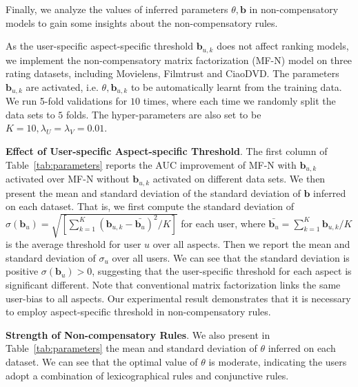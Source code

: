 \documentclass[letterpaper]{article} %
\begin{document}
Finally, we analyze the values of inferred parameters $\theta,\mathbf{b}$ in non-compensatory models to gain some insights about the non-compensatory rules. 

As the user-specific aspect-specific threshold $\mathbf{b}_{u,k}$ does not affect ranking models, we implement the non-compensatory matrix factorization (MF-N) model on three rating datasets, including Movielens, Filmtrust and CiaoDVD. The parameters $\mathbf{b}_{u,k}$ are activated, i.e. $\theta,\mathbf{b}_{u,k}$ to be automatically learnt from the training data. We run 5-fold validations for $10$ times, where each time we randomly split the data sets to $5$ folds. The hyper-parameters are also set to be $K=10, \lambda_U=\lambda_V=0.01$.

\textbf{Effect of User-specific Aspect-specific Threshold}. The first column of Table~\ref{tab:parameters} reports the AUC improvement of MF-N with $\mathbf{b}_{u,k}$ activated over MF-N without $\mathbf{b}_{u,k}$ activated on different data sets. We then present the mean and standard deviation of the standard deviation of $\mathbf{b}$ inferred on each dataset. That is, we first compute the standard deviation of $\sigma(\mathbf{b}_u)=\sqrt {[\sum_{k=1}^{K} (\mathbf{b}_{u,k}-\bar{\mathbf{b}_u})^2 /K]} $ for each user, where $\bar{\mathbf{b}_u}=\sum_{k=1}^K \mathbf{b}_{u,k} /K$ is the average threshold for user $u$ over all aspects. Then we report the mean and standard deviation of $\sigma_u$ over all users. We can see that the standard deviation is positive $\sigma(\mathbf{b}_{u})>0$, suggesting that the user-specific threshold for each aspect is significant different. Note that conventional matrix factorization links the same user-bias to all aspects. Our experimental result demonstrates that it is necessary to employ aspect-specific threshold in non-compensatory rules. 

\textbf{Strength of Non-compensatory Rules}. We also present in Table~\ref{tab:parameters} the mean and standard deviation of $\theta$ inferred on each dataset. We can see that the optimal value of $\theta$ is moderate, indicating the users adopt a combination of lexicographical rules and conjunctive rules.  

\begin{table}[htp]
\caption{AUC improvements with $\mathbf{b}$ activated, scale of parameters $\mathbf{b}_{u,k}$ and $\theta$.}
\small
\centering
{}
\label{tab:parameters}
\end{table}
\end{document}
